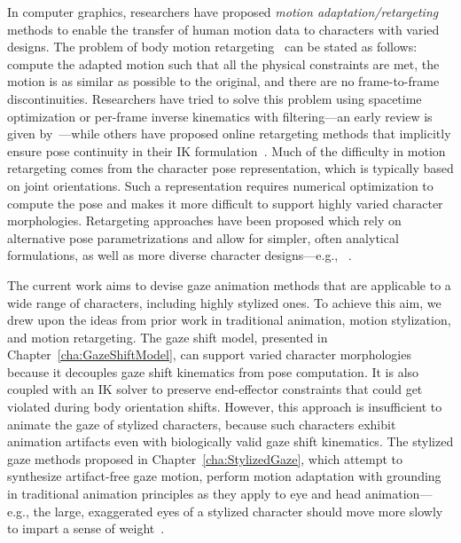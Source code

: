 In computer graphics, researchers have proposed \emph{motion adaptation/retargeting} methods to enable the transfer of human motion data to characters with varied designs. The problem of body motion retargeting~\citep{gleicher1998retargetting} can be stated as follows: compute the adapted motion such that all the physical constraints are met, the motion is as similar as possible to the original, and there are no frame-to-frame discontinuities. Researchers have tried to solve this problem using spacetime optimization or per-frame inverse kinematics with filtering---an early review is given by~\citet{gleicher2001comparing}---while others have proposed online retargeting methods that implicitly ensure pose continuity in their IK formulation~\citep{shin2001puppetry}. Much of the difficulty in motion retargeting comes from the character pose representation, which is typically based on joint orientations. Such a representation requires numerical optimization to compute the pose and makes it more difficult to support highly varied character morphologies. Retargeting approaches have been proposed which rely on alternative pose parametrizations and allow for simpler, often analytical formulations, as well as more diverse character designs---e.g., ~\citep{multon2008mkm,hecker2008real,ho2010spatial}.

The current work aims to devise gaze animation methods that are applicable to a wide range of characters, including highly stylized ones. To achieve this aim, we drew upon the ideas from prior work in traditional animation, motion stylization, and motion retargeting. The gaze shift model, presented in Chapter~\ref{cha:GazeShiftModel}, can support varied character morphologies because it decouples gaze shift kinematics from pose computation. It is also coupled with an IK solver to preserve end-effector constraints that could get violated during body orientation shifts. However, this approach is insufficient to animate the gaze of stylized characters, because such characters exhibit animation artifacts even with biologically valid gaze shift kinematics. The stylized gaze methods proposed in Chapter~\ref{cha:StylizedGaze}, which attempt to synthesize artifact-free gaze motion, perform motion adaptation with grounding in traditional animation principles as they apply to eye and head animation---e.g., the large, exaggerated eyes of a stylized character should move more slowly to impart a sense of weight~\citep{williams2009animator}.